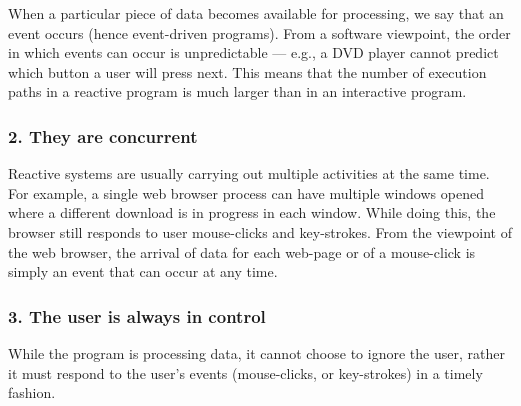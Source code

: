 \documentclass{article}
\begin{document}
When a particular piece of data becomes available for processing, we say that an event occurs (hence event-driven programs). From a software viewpoint, the order in which events can occur is unpredictable — e.g., a DVD player cannot predict which button a user will press next. This means that the number of execution paths in a reactive program is much larger than in an interactive program.

\subsubsection{2. They are concurrent} 

Reactive systems are usually carrying out multiple activities at the same time. For example, a single web browser process can have multiple windows opened where a different download is in progress in each window. While doing this, the browser still responds to user mouse-clicks and key-strokes. From the viewpoint of the web browser, the arrival of data for each web-page or of a mouse-click is simply an event that can occur at any time.

\subsubsection{3. The user is always in control} 

While the program is processing data, it cannot choose to ignore the user, rather it must respond to the user's events (mouse-clicks, or key-strokes) in a timely fashion.
\end{document}
